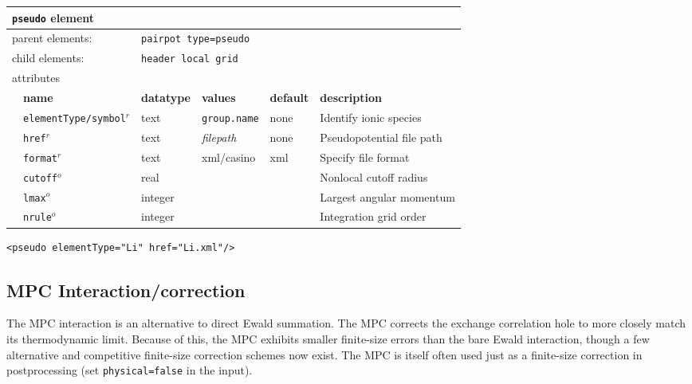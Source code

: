 \begin{table}[h]
\begin{center}
\begin{tabularx}{\textwidth}{l l l l l X }
\hline
\multicolumn{6}{l}{\texttt{pseudo} element} \\
\hline
\multicolumn{2}{l}{parent elements:} & \multicolumn{4}{l}{\texttt{pairpot type=pseudo}}\\
\multicolumn{2}{l}{child  elements:} & \multicolumn{4}{l}{\texttt{header local grid}}\\
\multicolumn{2}{l}{attributes}  & \multicolumn{4}{l}{}\\
   &   \bfseries name     & \bfseries datatype & \bfseries values & \bfseries default   & \bfseries description \\
   & \texttt{elementType/symbol}$^r$&  text    &\texttt{group.name}& none               & Identify ionic species   \\
   & \texttt{href}$^r$    &  text              & \textit{filepath}& none                & Pseudopotential file path\\
   & \texttt{format}$^r$  &  text              & xml/casino       & xml                 & Specify file format\\
   & \texttt{cutoff}$^o$  &  real              &                  &                     & Nonlocal cutoff radius  \\
   & \texttt{lmax}$^o$    &  integer           &                  &                     & Largest angular momentum  \\
   & \texttt{nrule}$^o$   &  integer           &                  &                     & Integration grid order             \\
  \hline
\end{tabularx}
\end{center}
\end{table}
\FloatBarrier


\begin{lstlisting}[style=QMCPXML,caption=QMCPXML element for pseudopotential of single ionic species.]
  <pseudo elementType="Li" href="Li.xml"/>
\end{lstlisting}



\subsection{MPC Interaction/correction}

The MPC interaction is an alternative to direct Ewald summation.  The MPC corrects the exchange correlation hole to more closely match its thermodynamic limit.  Because of this, the MPC exhibits smaller finite-size errors than the bare Ewald interaction, though a few alternative and competitive finite-size correction schemes now exist.  The MPC is itself often used just as a finite-size correction in postprocessing (set \texttt{physical=false} in the input).  


